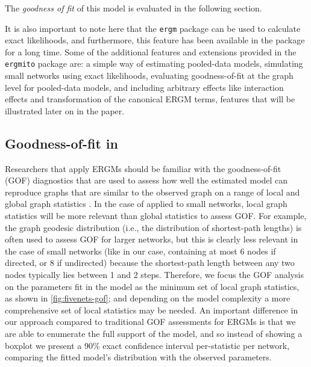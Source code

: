 \documentclass[review, nonatbib,doubleblind]{elsarticle/elsarticle}
\begin{document}
The \textit{goodness of fit} of this model is evaluated in the following section.

It is also important to note here that the \texttt{ergm} package can be used to calculate exact likelihoods, and furthermore, this feature has been available in the package for a long time. Some of the additional features and extensions provided in the \texttt{ergmito} package are: a simple way of estimating pooled-data models, simulating small networks using exact likelihoods, evaluating goodness-of-fit at the graph level for pooled-data models, and including arbitrary effects like interaction effects and transformation of the canonical ERGM terms, features that will be illustrated later on in the paper.




\subsection{Goodness-of-fit in \ergmitos}

Researchers that apply ERGMs should be familiar with the goodness-of-fit (GOF) diagnostics that are used to assess how well the estimated model can reproduce graphs that are similar to the observed graph on a range of local and global graph statistics \cite{Hunteretal2008}. In the case of \ergmitos{} applied to small networks, local graph statistics will be more relevant than global statistics to assess GOF. For example, the graph geodesic distribution (i.e., the distribution of shortest-path lengths) is often used to assess GOF for larger networks, but this is clearly less relevant in the case of small networks (like in our case, containing at most 6 nodes if directed, or 8 if undirected) because the shortest-path length between any two nodes typically lies between 1 and 2 steps. Therefore, we focus the GOF analysis on the parameters fit in the model as the minimum set of local graph statistics, as shown in \autoref{fig:fivenets-gof}; and depending on the model complexity a more comprehensive set of local statistics may be needed. An important difference in our approach compared to traditional GOF assessments for ERGMs is that we are able to enumerate the full support of the model, and so instead of showing a boxplot we present a 90\% exact confidence interval per-statistic per network, comparing the fitted model's distribution with the observed parameters. %
\end{document}
